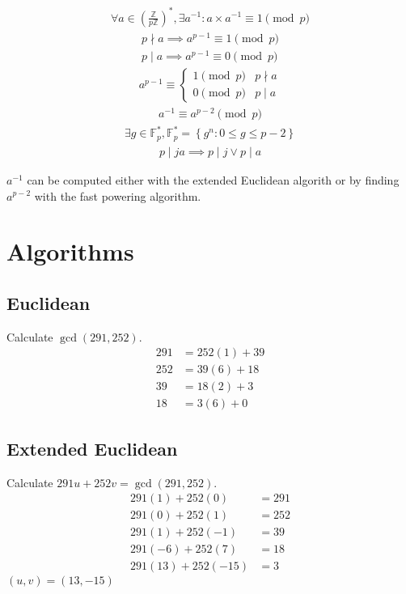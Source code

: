 \documentclass{article}
\newcommand{\curly}[1]{\left\{ #1 \right\}}
\newcommand{\soft}[1]{\left( #1 \right)}
\begin{document}
\begin{multicols*}{2}
\begin{align*}
    \forall a \in \soft{\frac{\mathbb{Z}}{p\mathbb{Z}}}^*, \exists a^{-1} : a \times a^{-1} \equiv 1 \pmod{p}
\end{align*}
\begin{align*}
    p \nmid a \implies a^{p-1} \equiv 1 \pmod{p} \\
    p  \mid a \implies a^{p-1} \equiv 0 \pmod{p}
\end{align*}
\begin{align*}
    a^{p-1} \equiv \begin{cases}
        1 \pmod{p} & p \nmid a \\
        0 \pmod{p} & p  \mid a
    \end{cases}
\end{align*}
\begin{align*}
    a^{-1} \equiv a^{p-2} \pmod{p}
\end{align*}
\begin{align*}
    \exists g \in \mathbb{F}_p^* , \mathbb{F}_p^* = \curly{g^n : 0 \leq g \leq p - 2}
\end{align*}
\begin{align*}
    p \mid ja \implies p \mid j \vee p \mid a
\end{align*}

$a^{-1}$ can be computed either with the extended Euclidean algorith or by finding $a^{p-2}$ with the fast powering algorithm.

\end{multicols*}

\section*{Algorithms}

\subsection*{Euclidean}
Calculate $\gcd(291, 252)$.
\begin{align*}
    291 &= 252(1) + 39        \\
    252 &= 39(6)  + 18        \\
    39  &= 18(2)  + \boxed{3} \\
    18  &= 3(6)   + 0
\end{align*}

\subsection*{Extended Euclidean}
Calculate $291u + 252v = \gcd(291, 252)$.
\begin{align*}
    291(1)  + 252(0)   &= 291 \\
    291(0)  + 252(1)   &= 252 \\
    291(1)  + 252(-1)  &= 39  \\
    291(-6) + 252(7)   &= 18  \\
    291(13) + 252(-15) &= 3
\end{align*}
$(u, v) = (13, -15)$
\end{document}
